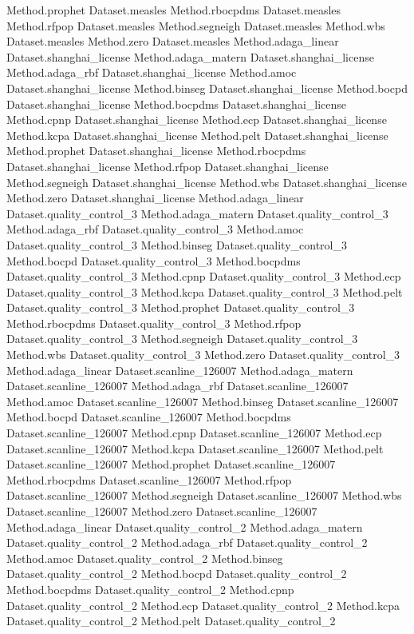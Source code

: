 Method.prophet Dataset.measles
Method.rbocpdms Dataset.measles
Method.rfpop Dataset.measles
Method.segneigh Dataset.measles
Method.wbs Dataset.measles
Method.zero Dataset.measles
Method.adaga_linear Dataset.shanghai_license
Method.adaga_matern Dataset.shanghai_license
Method.adaga_rbf Dataset.shanghai_license
Method.amoc Dataset.shanghai_license
Method.binseg Dataset.shanghai_license
Method.bocpd Dataset.shanghai_license
Method.bocpdms Dataset.shanghai_license
Method.cpnp Dataset.shanghai_license
Method.ecp Dataset.shanghai_license
Method.kcpa Dataset.shanghai_license
Method.pelt Dataset.shanghai_license
Method.prophet Dataset.shanghai_license
Method.rbocpdms Dataset.shanghai_license
Method.rfpop Dataset.shanghai_license
Method.segneigh Dataset.shanghai_license
Method.wbs Dataset.shanghai_license
Method.zero Dataset.shanghai_license
Method.adaga_linear Dataset.quality_control_3
Method.adaga_matern Dataset.quality_control_3
Method.adaga_rbf Dataset.quality_control_3
Method.amoc Dataset.quality_control_3
Method.binseg Dataset.quality_control_3
Method.bocpd Dataset.quality_control_3
Method.bocpdms Dataset.quality_control_3
Method.cpnp Dataset.quality_control_3
Method.ecp Dataset.quality_control_3
Method.kcpa Dataset.quality_control_3
Method.pelt Dataset.quality_control_3
Method.prophet Dataset.quality_control_3
Method.rbocpdms Dataset.quality_control_3
Method.rfpop Dataset.quality_control_3
Method.segneigh Dataset.quality_control_3
Method.wbs Dataset.quality_control_3
Method.zero Dataset.quality_control_3
Method.adaga_linear Dataset.scanline_126007
Method.adaga_matern Dataset.scanline_126007
Method.adaga_rbf Dataset.scanline_126007
Method.amoc Dataset.scanline_126007
Method.binseg Dataset.scanline_126007
Method.bocpd Dataset.scanline_126007
Method.bocpdms Dataset.scanline_126007
Method.cpnp Dataset.scanline_126007
Method.ecp Dataset.scanline_126007
Method.kcpa Dataset.scanline_126007
Method.pelt Dataset.scanline_126007
Method.prophet Dataset.scanline_126007
Method.rbocpdms Dataset.scanline_126007
Method.rfpop Dataset.scanline_126007
Method.segneigh Dataset.scanline_126007
Method.wbs Dataset.scanline_126007
Method.zero Dataset.scanline_126007
Method.adaga_linear Dataset.quality_control_2
Method.adaga_matern Dataset.quality_control_2
Method.adaga_rbf Dataset.quality_control_2
Method.amoc Dataset.quality_control_2
Method.binseg Dataset.quality_control_2
Method.bocpd Dataset.quality_control_2
Method.bocpdms Dataset.quality_control_2
Method.cpnp Dataset.quality_control_2
Method.ecp Dataset.quality_control_2
Method.kcpa Dataset.quality_control_2
Method.pelt Dataset.quality_control_2
